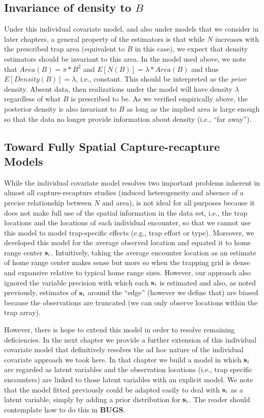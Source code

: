 \subsection{Invariance of density to $B$}

Under this individual covariate model, and also under models that we
consider in later chapters, a general property of the estimators is
that while $N$ increases with the prescribed trap area (equivalent to
$B$ in this case), we expect that density estimators should be
invariant to this area. In the model used above, we note that
$Area(B) = \pi*B^{2}$ and $E[N(B)] =
\lambda*Area(B)$ and thus $E[Density(B)] = \lambda$, i.e.,
constant. This should be interpreted as the {\it prior}
density. Absent data, then realizations under the model will have
density $\lambda$ regardless of what $B$ is prescribed to be.
As we verified empirically above, the posterior density is also
invariant to $B$ as long as the implied area is large enough so
that the data no longer provide information about density (i.e., ``far
away'').

\subsection{Toward Fully Spatial Capture-recapture Models}

While the individual covariate model resolves two important problems
inherent in almost all capture-recapture studies (induced
heterogeneity and absence of a precise relationship between $N$ and
area), is not ideal for all purposes because it does not make full use
of the spatial information in the data set, i.e., the trap locations
and the locations of each individual encounter, so that we cannot use
this model to model trap-specific effects (e.g., trap effort or type).
Moreover, we developed this model for the average observed location
and equated it to home range center ${\bf s}_{i}$. Intuitively, taking
the average encounter location as an estimate of home range center
makes sense but more so when the trapping grid is dense and expansive
relative to typical home range sizes.  However, our approach also
ignored the variable precision with which each ${\bf s}_{i}$ is
estimated and also, as noted previously, estimates of ${\bf s}_{i}$
around the ``edge'' (however we define that) are biased because the
observations are truncated (we can only observe locations within the
trap array).

However, there is hope to extend this model in order to resolve
remaining deficiencies.  In the next chapter we provide a further
extension of this individual covariate model that definitively
resolves the ad hoc nature of the individual covariate approach we
took here. In that chapter we build a model in which ${\bf s}_{i}$ are
regarded as latent variables and the observation locations (i.e., trap
specific encounters) are linked to those latent variables with an
explicit model. We note that the model fitted previously could be
adapted easily to deal with ${\bf s}_{i}$ as a latent variable, simply
by adding a prior distribution for ${\bf s}_{i}$. The reader should
contemplate how to do this in {\bf BUGS}.


